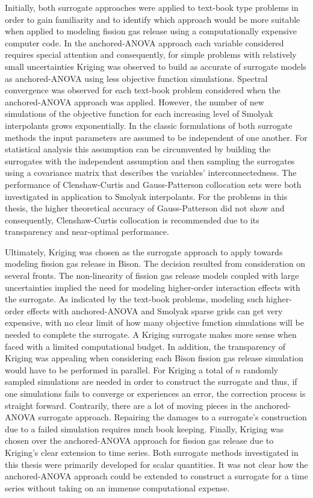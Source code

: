 Initially, both surrogate approaches were applied to text-book type problems in order to gain familiarity and to identify which approach would be more suitable when applied to modeling fission gas release using a computationally expensive computer code. In the anchored-\ac{ANOVA} approach each variable considered requires special attention and consequently, for simple problems with relatively small uncertainties Kriging was observed to build as accurate of surrogate models as anchored-\ac{ANOVA} using less objective function simulations. Spectral convergence was observed for each text-book problem considered when the anchored-\ac{ANOVA} approach was applied. However, the number of new simulations of the objective function for each increasing level of Smolyak interpolants grows exponentially. In the classic formulations of both surrogate methods the input parameters are assumed to be independent of one another. For statistical analysis this assumption can be circumvented by building the surrogates with the independent assumption and then sampling the surrogates using a covariance matrix that describes the variables' interconnectedness. The performance of Clenshaw-Curtis and Gauss-Patterson collocation sets were both investigated in application to Smolyak interpolants. For the problems in this thesis, the higher theoretical accuracy of Gauss-Patterson did not show and consequently, Clenshaw-Curtis collocation is recommended due to its transparency and near-optimal performance. 

Ultimately, Kriging was chosen as the surrogate approach to apply towards modeling fission gas release in Bison. The decision resulted from consideration on several fronts. The non-linearity of fission gas release models coupled with large uncertainties implied the need for modeling higher-order interaction effects with the surrogate. As indicated by the text-book problems, modeling such higher-order effects with anchored-\ac{ANOVA} and Smolyak sparse grids can get very expensive, with no clear limit of how many objective function simulations will be needed to complete the surrogate. A Kriging surrogate makes more sense when faced with a limited computational budget. In addition, the transparency of Kriging was appealing when considering each Bison fission gas release simulation would have to be performed in parallel. For Kriging a total of $n$ randomly sampled simulations are needed in order to construct the surrogate and thus, if one simulations fails to converge or experiences an error, the correction process is straight forward. Contrarily, there are a lot of moving pieces in the anchored-\ac{ANOVA} surrogate approach. Repairing the damages to a surrogate's construction due to a failed simulation requires much book keeping. Finally, Kriging was chosen over the anchored-\ac{ANOVA} approach for fission gas release due to Kriging's clear extension to time series. Both surrogate methods investigated in this thesis were primarily developed for scalar quantities. It was not clear how the anchored-\ac{ANOVA} approach could be extended to construct a surrogate for a time series without taking on an immense computational expense.     

